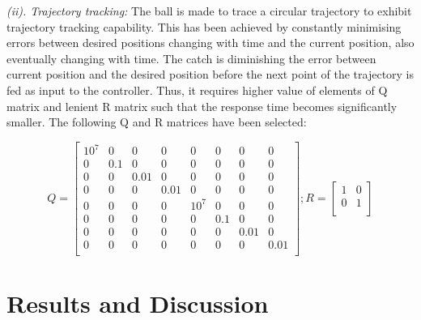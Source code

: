 \documentclass[conference]{IEEEtran}
\begin{document}
\emph{(ii). Trajectory tracking:} The ball is made to trace a circular trajectory to exhibit trajectory tracking capability. This has been achieved by constantly minimising errors between desired positions changing with time and the current position, also eventually changing with time. The catch is diminishing the error between current position and the desired position before the next point of the trajectory is fed as input to the controller. Thus, it requires higher value of elements of Q matrix and lenient R matrix such that the response time becomes significantly smaller. The following Q and R matrices have been selected:

\footnotesize
\begin{equation}
Q = \begin{bmatrix}
10^7 & 0 & 0 & 0 & 0 & 0 & 0 & 0 \\
0 & 0.1 & 0 & 0 & 0 & 0 & 0 & 0 \\
0 & 0 & 0.01 & 0 & 0 & 0 & 0 & 0 \\
0 & 0 & 0 & 0.01 & 0 & 0 & 0 & 0 \\
0 & 0 & 0 & 0 & 10^7 & 0 & 0 & 0 \\
0 & 0 & 0 & 0 & 0 & 0.1 & 0 & 0 \\
0 & 0 & 0 & 0 & 0 & 0 & 0.01 & 0 \\
0 & 0 & 0 & 0 & 0 & 0 & 0 & 0.01 \\
\end{bmatrix} ; 
R = \begin{bmatrix}
1& 0 \\
0 & 1 \\
\end{bmatrix}\label{eq27}
\end{equation}
\normalsize

\section{Results and Discussion}
\end{document}
